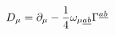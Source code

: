 \begin{equation}
D_{\mu }=\partial _{\mu }-\frac{1}{4}\omega _{\mu \underline{ab}}\Gamma ^{%
\underline{ab}}
\end{equation}

